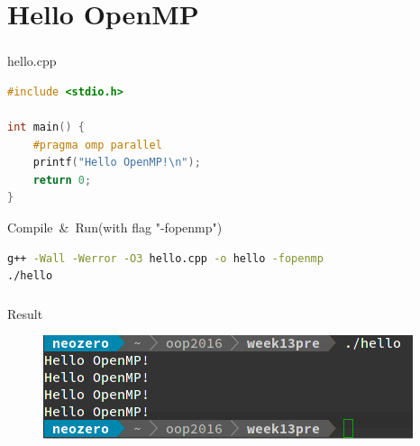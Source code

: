 \documentclass{beamer}
\begin{document}
	\section{Hello OpenMP}
	\begin{frame}[fragile]
		\frametitle{\insertsection}
		\begin{block}{hello.cpp}
		\begin{lstlisting}[language=C++]
#include <stdio.h>

int main() {
    #pragma omp parallel
    printf("Hello OpenMP!\n");
    return 0;
}\end{lstlisting}
		\end{block}
		\begin{block}{Compile\ \&\ Run(with flag "-fopenmp")}
		\begin{lstlisting}[language=bash]
g++ -Wall -Werror -O3 hello.cpp -o hello -fopenmp
./hello\end{lstlisting}
		\end{block}
\end{frame}
	\begin{frame}
		\frametitle{\insertsection}
		\begin{block}{Result}
			\begin{figure}[H]
				\centering
				\includegraphics[width=\linewidth]{helloopenmp.png}
			\end{figure}
		\end{block}
	\end{frame}
	
\end{document}
